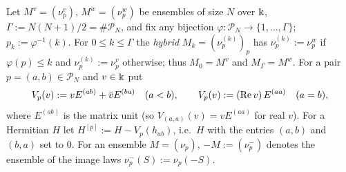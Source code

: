 \begin{definition}\label{def:hyb}
Let $M^v=(\nu^v_p)$, $M^w=(\nu^w_p)$ be ensembles of size $N$ over $\Bbbk$, $\Gamma:=N(N+1)/2=\#\mathcal P_N$, and fix any bijection
$\varphi:\mathcal P_N\to\{1,\dots,\Gamma\}$; $p_k:=\varphi^{-1}(k)$. For $0\le k\le\Gamma$ the \emph{hybrid} $M_k=(\nu^{(k)}_p)_p$ has
$\nu^{(k)}_p:=\nu^w_p$ if $\varphi(p)\le k$ and $\nu^{(k)}_p:=\nu^v_p$ otherwise; thus $M_0=M^v$ and $M_\Gamma=M^w$.
For a pair $p=(a,b)\in\mathcal P_N$ and $v\in\Bbbk$ put
\[
V_p(v):=vE^{(ab)}+\bar vE^{(ba)}\quad(a<b),\qquad V_p(v):=(\operatorname{Re} v)\,E^{(aa)}\quad(a=b),
\]
where $E^{(ab)}$ is the matrix unit (so $V_{(a,a)}(v)=vE^{(aa)}$ for real $v$). For a Hermitian $H$ let $H^{[p]}:=H-V_p(h_{ab})$, i.e.\ $H$ with the entries
$(a,b)$ and $(b,a)$ set to $0$. For an ensemble $M=(\nu_p)$, $-M:=(\nu^-_p)$ denotes the ensemble of the image laws $\nu^-_p(S):=\nu_p(-S)$.
\end{definition}

